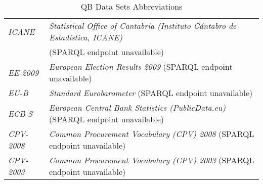\documentclass{llncs}
\begin{document}
\begin{table}[H]
\begin{tabular}{l|l}
		\emph{ICANE} & \emph{Statistical Office of Cantabria (Instituto Cántabro de Estadística, ICANE)} \\ 
		      & (SPARQL endpoint unavailable) \\
		\emph{EE-2009} & \emph{European Election Results 2009} (SPARQL endpoint unavailable) \\
		\emph{EU-B} & \emph{Standard Eurobarometer} (SPARQL endpoint unavailable) \\
		\emph{ECB-S} & \emph{European Central Bank Statistics (PublicData.eu)} (SPARQL endpoint unavailable) \\
		\emph{CPV-2008} & \emph{Common Procurement Vocabulary (CPV) 2008} (SPARQL endpoint unavailable) \\
		\emph{CPV-2003} & \emph{Common Procurement Vocabulary (CPV) 2003} (SPARQL endpoint unavailable) \\
		\end{tabular}
	\caption{QB Data Sets Abbreviations}
	\label{tab:data-cube-data-sets-abbreviations}
\end{table}
\end{document}
